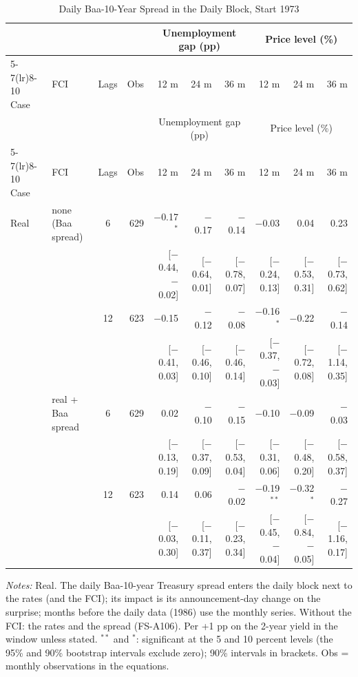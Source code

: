 \begingroup\scriptsize\setlength{\tabcolsep}{0.9pt}
\begin{longtable}{llcrrrrrrr}
\caption{Daily Baa-10-Year Spread in the Daily Block, Start 1973}\label{tab:appA273}\\
\toprule
 & & & & \multicolumn{3}{c}{Unemployment gap (pp)} & \multicolumn{3}{c}{Price level (\%)}\\ \cmidrule(lr){5-7}\cmidrule(lr){8-10}
Case & FCI & Lags & Obs & 12 m & 24 m & 36 m & 12 m & 24 m & 36 m\\
\midrule\endfirsthead
\toprule
 & & & & \multicolumn{3}{c}{Unemployment gap (pp)} & \multicolumn{3}{c}{Price level (\%)}\\ \cmidrule(lr){5-7}\cmidrule(lr){8-10}
Case & FCI & Lags & Obs & 12 m & 24 m & 36 m & 12 m & 24 m & 36 m\\
\midrule\endhead
\bottomrule\endfoot
Real & none (Baa spread) & 6 & 629 & $-$0.17$^{*}$ & $-$0.17 & $-$0.14 & $-$0.03 & 0.04 & 0.23\\
 & & & & {\scriptsize [$-$0.44, $-$0.02]} & {\scriptsize [$-$0.64, 0.01]} & {\scriptsize [$-$0.78, 0.07]} & {\scriptsize [$-$0.24, 0.13]} & {\scriptsize [$-$0.53, 0.31]} & {\scriptsize [$-$0.73, 0.62]}\\
 &  & 12 & 623 & $-$0.15 & $-$0.12 & $-$0.08 & $-$0.16$^{*}$ & $-$0.22 & $-$0.14\\
 & & & & {\scriptsize [$-$0.41, 0.03]} & {\scriptsize [$-$0.46, 0.10]} & {\scriptsize [$-$0.46, 0.14]} & {\scriptsize [$-$0.37, $-$0.03]} & {\scriptsize [$-$0.72, 0.08]} & {\scriptsize [$-$1.14, 0.35]}\\
 & real + Baa spread & 6 & 629 & 0.02 & $-$0.10 & $-$0.15 & $-$0.10 & $-$0.09 & $-$0.03\\
 & & & & {\scriptsize [$-$0.13, 0.19]} & {\scriptsize [$-$0.37, 0.09]} & {\scriptsize [$-$0.53, 0.04]} & {\scriptsize [$-$0.31, 0.06]} & {\scriptsize [$-$0.48, 0.20]} & {\scriptsize [$-$0.58, 0.37]}\\
 &  & 12 & 623 & 0.14 & 0.06 & $-$0.02 & $-$0.19$^{**}$ & $-$0.32$^{*}$ & $-$0.27\\
 & & & & {\scriptsize [$-$0.03, 0.30]} & {\scriptsize [$-$0.11, 0.37]} & {\scriptsize [$-$0.23, 0.34]} & {\scriptsize [$-$0.45, $-$0.04]} & {\scriptsize [$-$0.84, $-$0.05]} & {\scriptsize [$-$1.16, 0.17]}\\
\end{longtable}
\begin{flushleft}\footnotesize\textit{Notes:} Real. The daily Baa-10-year Treasury spread enters the daily block next to the rates (and the FCI); its impact is its announcement-day change on the surprise; months before the daily data (1986) use the monthly series. Without the FCI: the rates and the spread (FS-A106). Per +1 pp on the 2-year yield in the window unless stated. $^{**}$ and $^{*}$: significant at the 5 and 10 percent levels (the 95\% and 90\% bootstrap intervals exclude zero); 90\% intervals in brackets. Obs = monthly observations in the equations.\end{flushleft}
\endgroup
